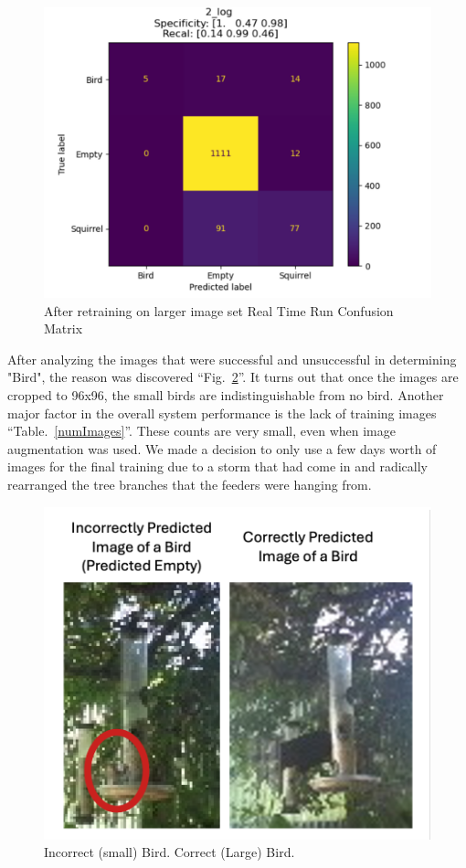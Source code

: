 \documentclass[conference]{IEEEtran}
\begin{document}
\begin{figure}[htbp]
\centerline{\includegraphics[scale=0.06]{afterReTrainConfMat.png}}
\caption{After retraining on larger image set Real Time Run Confusion Matrix}
\label{rt2ConfMat}
\end{figure}

After analyzing the images that were successful and unsuccessful in determining "Bird", the reason was discovered ``Fig.~\ref{sBirdbBird}''. It turns out that once the images are cropped to 96x96, the small birds are indistinguishable from no bird. Another major factor in the overall system performance is the lack of training images ``Table.~\ref{numImages}''. These counts are very small, even when image augmentation was used. We made a decision to only use a few days worth of images for the final training due to a storm that had come in and radically rearranged the tree branches that the feeders were hanging from.\\

\begin{figure}[htbp]
\centerline{\includegraphics[scale=0.5]{wongBirdRightBird-2.png}}
\caption{Incorrect (small) Bird. Correct (Large) Bird.}
\label{sBirdbBird}
\end{figure}
\end{document}
